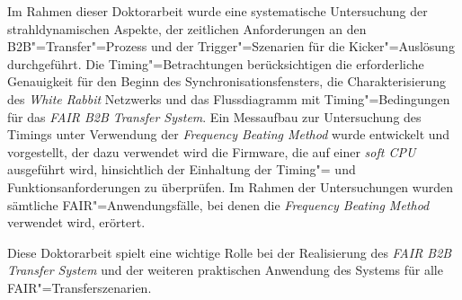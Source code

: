 Im Rahmen dieser Doktorarbeit wurde eine systematische Untersuchung der strahldynamischen Aspekte, der zeitlichen Anforderungen an den B2B"=Transfer"=Prozess und der Trigger"=Szenarien f\"ur die Kicker"=Ausl\"osung durchgef\"uhrt. Die Timing"=Betrachtungen ber\"ucksichtigen die erforderliche Genauigkeit f\"ur den Beginn des Synchronisationsfensters, die Charakterisierung des \textit{White Rabbit} Netzwerks und das Flussdiagramm mit Timing"=Bedingungen f\"ur das \textit{FAIR B2B Transfer System}. Ein Messaufbau zur Untersuchung des Timings unter Verwendung der \textit{Frequency Beating Method} wurde entwickelt und vorgestellt, der dazu verwendet wird die Firmware, die auf einer \textit{soft CPU} ausgef\"uhrt wird, hinsichtlich der Einhaltung der Timing"= und Funktionsanforderungen zu \"uberpr\"ufen. Im Rahmen der Untersuchungen wurden s\"amtliche FAIR"=Anwendungsf\"alle, bei denen die \textit{Frequency Beating Method} verwendet wird, er\"ortert.

Diese Doktorarbeit spielt eine wichtige Rolle bei der Realisierung des \textit{FAIR B2B Transfer System} und der weiteren praktischen Anwendung des Systems f\"ur alle FAIR"=Transferszenarien.

